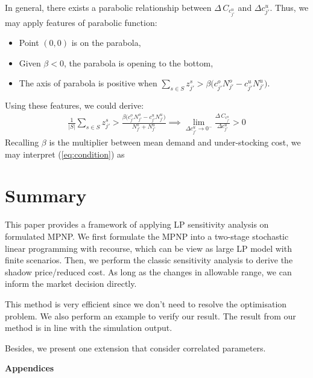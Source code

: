 \documentclass[a4paper,11pt]{article}
\begin{document}
In general, there exists a parabolic relationship between $\Delta \, C_{c_{j'}^u}$ and $\Delta c_{j'}^u$. Thus, we may apply features of parabolic function:
\begin{itemize}
    \item Point $(0,0)$ is on the parabola,
    \item Given $\beta < 0$, the parabola is opening to the bottom,
    \item The axis of parabola is positive when $\sum_{s \in S} z_{j'}^s > \beta \big( c_{j'}^o N_{j'}^o - c_{j'}^u N_{j'}^u \big)$.
\end{itemize}
Using these features, we could derive:
\begin{eqnarray}
\label{eq:condition}
    \frac{1}{|S|} \sum_{s \in S} z_{j'}^s > \frac{\beta \big( c_{j'}^o N_{j'}^o - c_{j'}^u N_{j'}^u \big)}{N_{j'}^o + N_{j'}^u} \implies \lim_{\Delta c_{j'}^u \to 0^-} \frac{\Delta \, C_{c_{j'}^u}}{\Delta c_{j'}^u} > 0
\end{eqnarray}
Recalling $\beta$ is the multiplier between mean demand and under-stocking cost, we may interpret (\ref{eq:condition}) as 





\section{Summary}
This paper provides a framework of applying LP sensitivity analysis on formulated MPNP. We first formulate the MPNP into a two-stage stochastic linear programming with recourse, which can be view as large LP model with finite scenarios. Then, we perform the classic sensitivity analysis to derive the shadow price/reduced cost. As long as the changes in allowable range, we can inform the market decision directly.

This method is very efficient since we don’t need to resolve the optimisation problem. We also perform an example to verify our result. The result from our method is in line with the simulation output.

Besides, we present one extension that consider correlated parameters. 

\printbibliography
\newpage
\begin{center}
{\bf\Large Appendices}
\end{center}
\end{document}
